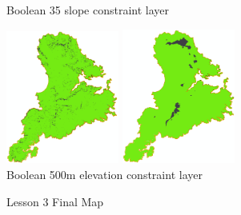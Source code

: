 \documentclass{article}
\begin{document}
\begin{figure}[h]
  \vspace{1cm}

  \begin{minipage}[b]{0.4\textwidth}
    \centering
    \caption{Boolean 35\textdegree{} slope constraint layer}
    \includegraphics[width=140px]{images/part3/final_criteria/constraint_35deg.PNG}
  \end{minipage}
  \hfill
  \begin{minipage}[b]{0.4\textwidth}
    \centering
    \caption{Boolean 500m elevation constraint layer}
    \includegraphics[width=140px]{images/part3/final_criteria/constraint_500m.PNG}
  \end{minipage}
\end{figure}

\newgeometry{}
\begin{figure}
  \centering
  \caption{Lesson 3 Final Map}
  \label{3_final}
\end{figure}
\end{document}
